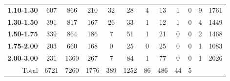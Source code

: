 \begin{table}[]
\begin{tabular}{r|cccccccccll}
\textbf{1.10-1.30}        & 607                         & 866                         & 210                         & 32                       & 28                         & 4                          & 13                         & 1                        & 0                          & 9      & 1761  \\
\textbf{1.30-1.50}        & 391                         & 817                         & 167                         & 26                       & 33                         & 1                          & 12                         & 1                        & 0                          & 4      & 1449  \\
\textbf{1.50-1.75}        & 339                         & 864                         & 186                         & 7                        & 51                         & 1                          & 21                         & 0                        & 0                          & 2      & 1468  \\
\textbf{1.75-2.00}        & 203                         & 660                         & 168                         & 0                        & 25                         & 0                          & 25                         & 0                        & 0                          & 1      & 1083  \\
\textbf{2.00-3.00}        & 231                         & 1360                        & 267                         & 7                        & 84                         & 1                          & 77                         & 0                        & 0                          & 1      & 2026  \\ \hline
Total                     & 6721                        & 7260                        & 1776                        & 389                      & 1252                       & 86                         & 486                        & 44                       & 5                          &        &      
\end{tabular}
\end{table}



